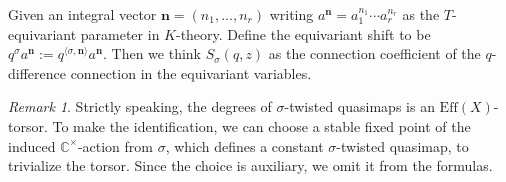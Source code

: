 \documentclass[reqno]{amsart}
\numberwithin{equation}{section}
\numberwithin{equation}{section}
\numberwithin{equation}{section}
\theoremstyle{definition}
\theoremstyle{remark}
\theoremstyle{remark}
\newtheorem{rem}[thm]{Remark}
\begin{document}
Given an integral vector $\mathbf{n} = (n_1, \dots, n_r)$ writing $a^{\mathbf{n}} = a_1^{n_1} \cdots a_r^{n_r}$ as the $T$-equivariant parameter in $K$-theory. Define the equivariant shift to be $q^{\sigma}a^{\mathbf{n}} := q^{\langle \sigma, \mathbf{n} \rangle} a^{\mathbf{n}}$. Then we think $S_{\sigma}(q,z)$ as the connection coefficient of the $q$-difference connection in the equivariant variables.

\begin{rem}
    Strictly speaking, the degrees of $\sigma$-twisted quasimaps is an $\mathrm{Eff}(X)$-torsor. To make the identification, we can choose a stable fixed point of the induced $\mathbb{C}^{\times}$-action from $\sigma$, which defines a constant $\sigma$-twisted quasimap, to trivialize the torsor. Since the choice is auxiliary, we omit it from the formulas.
\end{rem}
\end{document}
